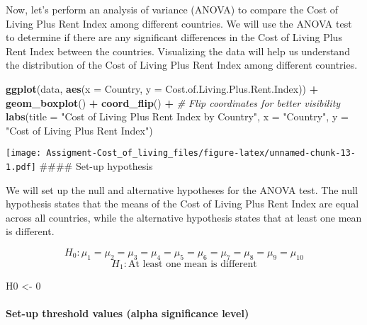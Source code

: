 \documentclass[
]{article}
\newenvironment{Shaded}{\begin{snugshade}}{\end{snugshade}}
\newcommand{\AttributeTok}[1]{\textcolor[rgb]{0.13,0.29,0.53}{#1}}
\newcommand{\CommentTok}[1]{\textcolor[rgb]{0.56,0.35,0.01}{\textit{#1}}}
\newcommand{\DecValTok}[1]{\textcolor[rgb]{0.00,0.00,0.81}{#1}}
\newcommand{\FunctionTok}[1]{\textcolor[rgb]{0.13,0.29,0.53}{\textbf{#1}}}
\newcommand{\NormalTok}[1]{#1}
\newcommand{\OtherTok}[1]{\textcolor[rgb]{0.56,0.35,0.01}{#1}}
\newcommand{\SpecialCharTok}[1]{\textcolor[rgb]{0.81,0.36,0.00}{\textbf{#1}}}
\newcommand{\StringTok}[1]{\textcolor[rgb]{0.31,0.60,0.02}{#1}}
\begin{document}
Now, let's perform an analysis of variance (ANOVA) to compare the Cost
of Living Plus Rent Index among different countries. We will use the
ANOVA test to determine if there are any significant differences in the
Cost of Living Plus Rent Index between the countries. Visualizing the
data will help us understand the distribution of the Cost of Living Plus
Rent Index among different countries.

\begin{Shaded}
\begin{Highlighting}[]
\FunctionTok{ggplot}\NormalTok{(data, }\FunctionTok{aes}\NormalTok{(}\AttributeTok{x =}\NormalTok{ Country, }\AttributeTok{y =}\NormalTok{ Cost.of.Living.Plus.Rent.Index)) }\SpecialCharTok{+}
  \FunctionTok{geom\_boxplot}\NormalTok{() }\SpecialCharTok{+}
  \FunctionTok{coord\_flip}\NormalTok{() }\SpecialCharTok{+}  \CommentTok{\# Flip coordinates for better visibility}
  \FunctionTok{labs}\NormalTok{(}\AttributeTok{title =} \StringTok{"Cost of Living Plus Rent Index by Country"}\NormalTok{,}
       \AttributeTok{x =} \StringTok{"Country"}\NormalTok{,}
       \AttributeTok{y =} \StringTok{"Cost of Living Plus Rent Index"}\NormalTok{)}
\end{Highlighting}
\end{Shaded}

\texttt{[image: Assigment-Cost\_of\_living\_files/figure-latex/unnamed-chunk-13-1.pdf]}
\#\#\#\# Set-up hypothesis

We will set up the null and alternative hypotheses for the ANOVA test.
The null hypothesis states that the means of the Cost of Living Plus
Rent Index are equal across all countries, while the alternative
hypothesis states that at least one mean is different.

\[H_0: \mu_1 = \mu_2 = \mu_3 = \mu_4 = \mu_5 = \mu_6 = \mu_7 = \mu_8 = \mu_9 = \mu_{10}\]
\[H_1: \text{At least one mean is different}\]

\begin{Shaded}
\begin{Highlighting}[]
\NormalTok{H0 }\OtherTok{\textless{}{-}} \DecValTok{0}
\end{Highlighting}
\end{Shaded}

\paragraph{Set-up threshold values (alpha significance
level)}\label{set-up-threshold-values-alpha-significance-level}
\end{document}
